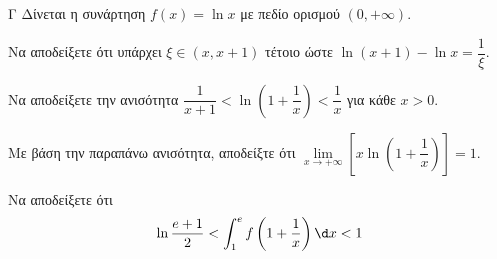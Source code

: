 \begin{thema}{Γ}
Δίνεται η συνάρτηση $f(x) = \ln x$ με πεδίο ορισμού $(0, +\infty)$.
\begin{erwthma}
\item Να αποδείξετε ότι υπάρχει $\xi \in (x, x+1)$ τέτοιο ώστε $\ln(x+1) - \ln x = \dfrac{1}{\xi}$.
\item Να αποδείξετε την ανισότητα $\dfrac{1}{x+1} < \ln\left(1 + \dfrac{1}{x}\right) < \dfrac{1}{x}$ για κάθε $x > 0$.
\item Με βάση την παραπάνω ανισότητα, αποδείξτε ότι $\lim\limits_{x \to +\infty} \left[x \ln\left(1 + \dfrac{1}{x}\right)\right] = 1$.
\item Να αποδείξετε ότι \[\ln{\frac{e+1}{2}}<\int_{1}^{e}{f\left(1+\frac{1}{x}\right)\d x}<1\]
\end{erwthma}
\end{thema}
